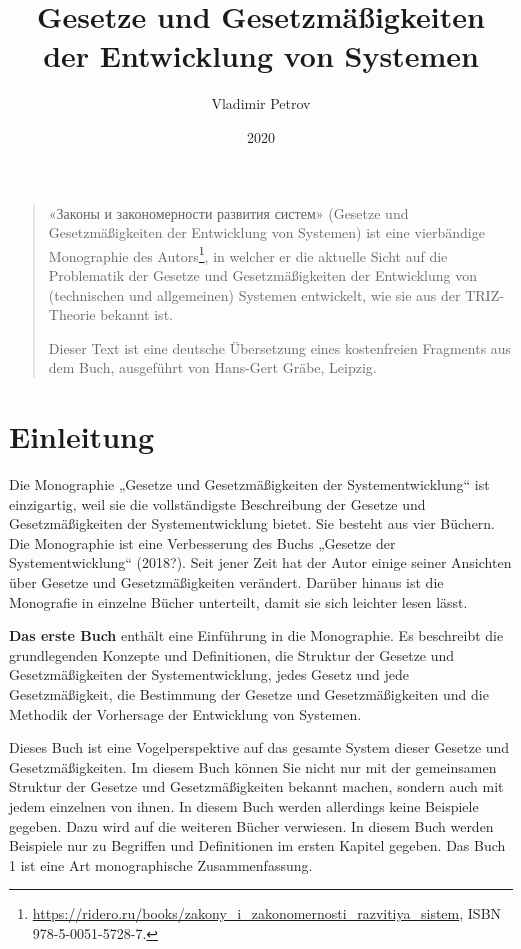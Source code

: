 \documentclass[11pt,a4paper]{article}
\title{Gesetze und Gesetzmäßigkeiten der Entwicklung von Systemen}
\author{Vladimir Petrov}
\date{2020}
\begin{document}
\maketitle

\begin{quote}
  \foreignlanguage{russian}{«Законы и закономерности развития систем»}
  (Gesetze und Gesetzmäßigkeiten der Entwicklung von Systemen) ist eine
  vierbändige Monographie des
  Autors\footnote{\url{https://ridero.ru/books/zakony_i_zakonomernosti_razvitiya_sistem},
    ISBN 978-5-0051-5728-7.}, in welcher er die aktuelle Sicht auf die
  Problematik der Gesetze und Gesetzmäßig\-keiten der Entwicklung von
  (technischen und allgemeinen) Systemen entwickelt, wie sie aus der
  TRIZ-Theorie bekannt ist.

  Dieser Text ist eine deutsche Übersetzung eines kostenfreien Fragments aus
  dem Buch, ausgeführt von Hans-Gert Gräbe, Leipzig.
\end{quote}
\section*{Einleitung}

Die Monographie „Gesetze und Gesetzmäßigkeiten der Systementwicklung“ ist
einzigartig, weil sie die vollständigste Beschreibung der Gesetze und
Gesetzmäßigkeiten der Systementwicklung bietet. Sie besteht aus vier
Büchern. Die Monographie ist eine Verbesserung des Buchs „Gesetze der
Systementwicklung“ (2018?).  Seit jener Zeit hat der Autor einige seiner
Ansichten über Gesetze und Gesetzmäßigkeiten verändert. Darüber hinaus ist die
Monografie in einzelne Bücher unterteilt, damit sie sich leichter lesen lässt.

\textbf{Das erste Buch} enthält eine Einführung in die Monographie. Es
beschreibt die grundlegenden Konzepte und Definitionen, die Struktur der
Gesetze und Gesetzmäßigkeiten der Systementwicklung, jedes Gesetz und jede
Gesetzmäßigkeit, die Bestimmung der Gesetze und Gesetzmäßigkeiten und die
Methodik der Vorhersage der Entwicklung von Systemen.

Dieses Buch ist eine Vogelperspektive auf das gesamte System dieser Gesetze
und Gesetz\-mäßig\-keiten. Im diesem Buch können Sie nicht nur mit der
gemeinsamen Struktur der Gesetze und Gesetzmäßigkeiten bekannt machen, sondern
auch mit jedem einzelnen von ihnen. In diesem Buch werden allerdings keine
Beispiele gegeben. Dazu wird auf die weiteren Bücher verwiesen.  In diesem
Buch werden Beispiele nur zu Begriffen und Definitionen im ersten Kapitel
gegeben. Das Buch 1 ist eine Art monographische Zusammenfassung.
\end{document}
